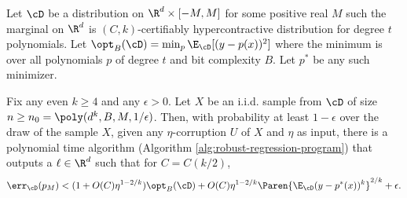 \begin{theorem} \label{thm:polyregression}
Let $\cD$ be a distribution on $\R^d \times [-M,M]$ for some positive real $M$ such the marginal on $\R^d$ is $(C,k)$-certifiably hypercontractive distribution for degree $t$ polynomials. Let $\opt_B(\cD) = \min_{p} \E_{\cD}[ (y - p(x))^2]$ where the minimum is over all polynomials $p$ of degree $t$ and bit complexity $B$. Let $p^{*}$ be any such minimizer. %

Fix any even $k \geq 4$ and any $\epsilon > 0$. Let $X$ be an i.i.d. sample from $\cD$ of size $n \geq n_0 = \poly(d^k, B, M, 1/\epsilon)$. %
Then, with probability at least $1-\epsilon$ over the draw of the sample $X$, given any $\eta$-corruption $U$ of $X$ and $\eta$ as input, there is a polynomial time algorithm (Algorithm \ref{alg:robust-regression-program}) that outputs a $\ell \in \R^d$ such that for $C = C(k/2)$, 
\[
\err_{\cD}(p_M) < (1 + O(C)\eta^{1-2/k}) \opt_B(\cD) + O(C) \eta^{1-2/k} \Paren{\E_{\cD} (y-p^{*}(x))^k}^{2/k} + \epsilon
.
\] 
\end{theorem}



